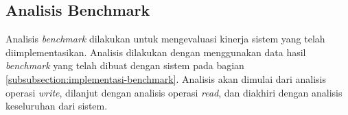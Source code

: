 \subsection{Analisis Benchmark}
\label{subsection:analisis-benchmark}

Analisis \textit{benchmark} dilakukan untuk mengevaluasi kinerja sistem yang telah diimplementasikan. Analisis dilakukan dengan menggunakan data hasil \textit{benchmark} yang telah dibuat dengan sistem pada bagian \ref{subsubsection:implementasi-benchmark}. Analisis akan dimulai dari analisis operasi \textit{write}, dilanjut dengan analisis operasi \textit{read}, dan diakhiri dengan analisis keseluruhan dari sistem.





